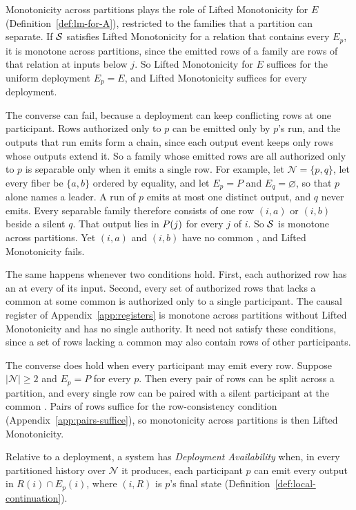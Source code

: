 Monotonicity across partitions plays the role of Lifted Monotonicity for $E$
(Definition~\ref{def:lm-for-A}), restricted to the families that a partition
can separate.  If $\mathcal{S}$ satisfies Lifted Monotonicity for a relation that
contains every $E_p$, it is monotone across partitions, since the emitted rows
of a family are rows of that relation at inputs below $j$.  So Lifted
Monotonicity for $E$ suffices for the uniform deployment $E_p=E$, and Lifted
Monotonicity suffices for every deployment.

The converse can fail, because a deployment can keep conflicting rows at one
participant.  Rows authorized only to $p$ can be emitted only by $p$'s run,
and the outputs that run emits form a chain, since each output event keeps
only rows whose outputs extend it.  So a family whose emitted rows are all
authorized only to $p$ is separable only when it emits a single row.  For
example, let $\mathcal N=\{p,q\}$, let every fiber be $\{a,b\}$ ordered by
equality, and let $E_p=P$ and $E_q=\varnothing$, so that $p$ alone names a
leader.  A run of $p$ emits at most one distinct output, and $q$ never emits.
Every separable family therefore consists of one row $(i,a)$ or $(i,b)$ beside
a silent $q$.  That output lies in $P(j)$ for every \indesc $j$ of $i$.
So $\mathcal{S}$ is monotone across partitions.  Yet $(i,a)$ and $(i,b)$ have no
common \outnoun, and Lifted Monotonicity fails.

The same happens whenever two conditions hold.  First, each authorized row has
an \outnoun at every \indesc of its input.  Second, every set of authorized
rows that lacks a common \outnoun at some common \indesc is authorized only to
a single participant.  The causal register of Appendix~\ref{app:registers} is
monotone across partitions without Lifted Monotonicity and has no single
authority.  It need not satisfy these conditions, since a set of rows lacking
a common \outnoun may also contain rows of other participants.

The converse does hold when every participant may emit every row.  Suppose
$|\mathcal N|\ge2$ and $E_p=P$ for every $p$.  Then every pair of rows can be
split across a partition, and every single row can be paired with a silent
participant at the common \indesc.  Pairs of rows suffice for the
row-consistency condition (Appendix~\ref{app:pairs-suffice}), so
monotonicity across partitions is then Lifted Monotonicity.

\begin{definition}
\label{def:deployment-availability}
Relative to a deployment, a system has \emph{Deployment Availability} when, in
every partitioned history over $\mathcal N$ it produces, each participant $p$
can emit every output in $R(i)\cap E_p(i)$, where $(i,R)$ is $p$'s final state
(Definition~\ref{def:local-continuation}).
\end{definition}

